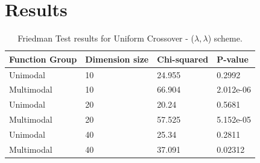 \section{Results}\label{sec:results}

\begin{table}[h]
	\centering
	\begin{tabular}{|l|l|l|l|}
		\hline
		\textbf{Function Group} & \textbf{Dimension size}      & \textbf{Chi-squared}        & \textbf{P-value}                     \\ \hline
		\multicolumn{1}{|l|}{Unimodal} & \multicolumn{1}{|l|}{10} & \multicolumn{1}{l|}{24.955} & \multicolumn{1}{l|}{ 0.2992} \\ \hline
		\multicolumn{1}{|l|}{Multimodal} & \multicolumn{1}{|l|}{10} & \multicolumn{1}{l|}{66.904} & \multicolumn{1}{l|}{2.012e-06}  \\ \hline
		\hline
		\multicolumn{1}{|l|}{Unimodal} & \multicolumn{1}{|l|}{20} & \multicolumn{1}{l|}{20.24} & \multicolumn{1}{l|}{0.5681} \\ \hline
		\multicolumn{1}{|l|}{Multimodal} & \multicolumn{1}{|l|}{20} & \multicolumn{1}{l|}{57.525} & \multicolumn{1}{l|}{5.152e-05}  \\ \hline
		\hline	
		\multicolumn{1}{|l|}{Unimodal} & \multicolumn{1}{|l|}{40} & \multicolumn{1}{l|}{25.34} & \multicolumn{1}{l|}{0.2811} \\ \hline
		\multicolumn{1}{|l|}{Multimodal} & \multicolumn{1}{|l|}{40} & \multicolumn{1}{l|}{37.091} & \multicolumn{1}{l|}{0.02312}  \\ \hline
	\end{tabular}
	\caption{Friedman Test results for Uniform Crossover - ($\lambda, \lambda$) scheme.}
	\label{Friedman_test_uniform-a}	
\end{table}


